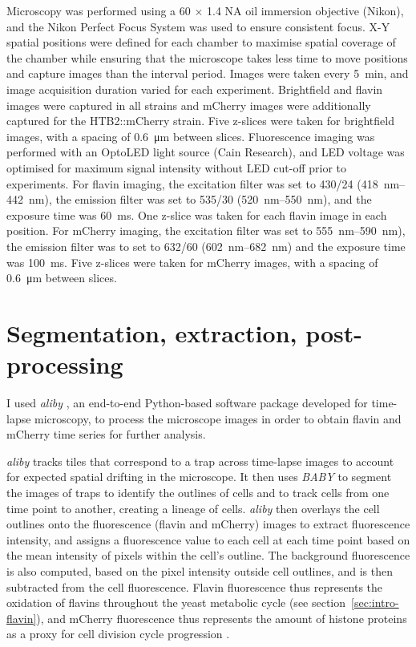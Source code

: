 Microscopy was performed using a 60 $\times$ 1.4 NA oil immersion objective (Nikon), and the Nikon Perfect Focus System was used to ensure consistent focus.
X-Y spatial positions were defined for each chamber to maximise spatial coverage of the chamber while ensuring that the microscope takes less time to move positions and capture images than the interval period.
Images were taken every \SI{5}{\minute}, and image acquisition duration varied for each experiment.
Brightfield and flavin images were captured in all strains and mCherry images were additionally captured for the HTB2::mCherry strain.
Five z-slices were taken for brightfield images, with a spacing of \SI{0.6}{\micro\metre} between slices.
Fluorescence imaging was performed with an OptoLED light source (Cain Research), and LED voltage was optimised for maximum signal intensity without LED cut-off prior to experiments.
For flavin imaging, the excitation filter was set to 430/24 (\SIrange{418}{442}{\nano\metre}), the emission filter was set to 535/30 (\SIrange{520}{550}{\nano\metre}), and the exposure time was \SI{60}{\milli\second}.
One z-slice was taken for each flavin image in each position.
For mCherry imaging, the excitation filter was set to \SIrange{555}{590}{\nano\metre}), the emission filter was to set to 632/60 (\SIrange{602}{682}{\nano\metre}) and the exposure time was \SI{100}{\milli\second}.
Five z-slices were taken for mCherry images, with a spacing of \SI{0.6}{\micro\metre} between slices.

\section{Segmentation, extraction, post-processing}
\label{sec:methods-segmentation}

I used \textit{aliby} \parencite{munozgonzalezPhenotypingSingleCells2023}, an end-to-end Python-based software package developed for time-lapse microscopy, to process the microscope images in order to obtain flavin and mCherry time series for further analysis.

\textit{aliby} tracks tiles that correspond to a trap across time-lapse images to account for expected spatial drifting in the microscope.
It then uses \textit{BABY} \parencite{pietschDeterminingGrowthRates2023} to segment the images of traps to identify the outlines of cells and to track cells from one time point to another, creating a lineage of cells.
\textit{aliby} then overlays the cell outlines onto the fluorescence (flavin and mCherry) images to extract fluorescence intensity, and assigns a fluorescence value to each cell at each time point based on the mean intensity of pixels within the cell's outline.
The background fluorescence is also computed, based on the pixel intensity outside cell outlines, and is then subtracted from the cell fluorescence.
Flavin fluorescence thus represents the oxidation of flavins throughout the yeast metabolic cycle (see section~\ref{sec:intro-flavin}), and mCherry fluorescence thus represents the amount of histone proteins as a proxy for cell division cycle progression \parencite{garmendia-torresMultipleInputsEnsure2018}.

